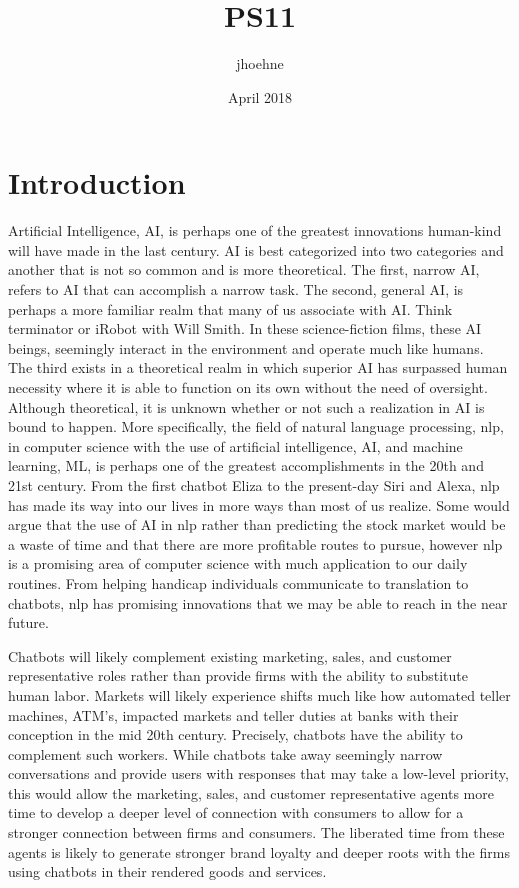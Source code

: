 \documentclass[12pt,english]{article}
\title{PS11}
\author{jhoehne }
\date{April 2018}
\begin{document}
\section{Introduction}
Artificial Intelligence, AI, is perhaps one of the greatest innovations human-kind will have made in the last century. AI is best categorized into two categories and another that is not so common and is more theoretical. The first, narrow AI, refers to AI that can accomplish a narrow task. The second, general AI, is perhaps a more familiar realm that many of us associate with AI. Think terminator or iRobot with Will Smith. In these science-fiction films, these AI beings, seemingly interact in the environment and operate much like humans. The third exists in a theoretical realm in which superior AI has surpassed human necessity where it is able to function on its own without the need of oversight. Although theoretical, it is unknown whether or not such a realization in AI is bound to happen. More specifically, the field of natural language processing, nlp, in computer science with the use of artificial intelligence, AI, and machine learning, ML, is perhaps one of the greatest accomplishments in the 20th and 21st century. From the first chatbot Eliza to the present-day Siri and Alexa, nlp has made its way into our lives in more ways than most of us realize. Some would argue that the use of AI in nlp rather than predicting the stock market would be a waste of time and that there are more profitable routes to pursue, however nlp is a promising area of computer science with much application to our daily routines. From helping handicap individuals communicate to translation to chatbots, nlp has promising innovations that we may be able to reach in the near future.

Chatbots will likely complement existing marketing, sales, and customer representative roles rather than provide firms with the ability to substitute human labor. Markets will likely experience shifts much like how automated teller machines, ATM’s, impacted markets and teller duties at banks with their conception in the mid 20th century. Precisely, chatbots have the ability to complement such workers. While chatbots take away seemingly narrow conversations and provide users with responses that may take a low-level priority, this would allow the marketing, sales, and customer representative agents more time to develop a deeper level of connection with consumers to allow for a stronger connection between firms and consumers. The liberated time from these agents is likely to generate stronger brand loyalty and deeper roots with the firms using chatbots in their rendered goods and services.
\end{document}
